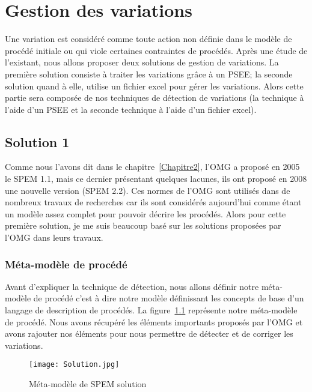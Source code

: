 \chapter{Gestion des variations} %

\label{Chapitre3} %
Une variation est considéré comme toute action non définie dans le modèle de procédé initiale ou qui viole certaines contraintes de procédés.
Après une étude de l'existant, nous allons proposer deux solutions de gestion de variations. La première solution consiste à traiter les variations grâce à un PSEE; la seconde solution quand à elle, utilise un fichier excel pour gérer les variations.
Alors cette partie sera composée de nos techniques de détection de variations (la technique à l'aide d'un PSEE et la seconde technique à l'aide d'un fichier excel).
\section{Solution 1}
Comme nous l'avons dit dans le chapitre~\ref{Chapitre2}, l'OMG a proposé en 2005 le SPEM 1.1, mais ce dernier présentant quelques lacunes, ils ont proposé en 2008 une nouvelle version (SPEM 2.2). 
Ces normes de l'OMG sont utilisés dans de nombreux travaux de recherches car ils sont considérés aujourd'hui comme étant un modèle assez complet pour pouvoir décrire les procédés. Alors pour cette première solution, je me suis beaucoup basé sur les solutions proposées par l'OMG dans leurs travaux.
\subsection{Méta-modèle de procédé}
Avant d'expliquer la technique de détection, nous allons définir notre méta-modèle de procédé c'est à dire notre modèle définissant les concepts de base d'un langage de description de procédés.
La figure~\ref{metamodele} représente notre méta-modèle de procédé. Nous avons récupéré les éléments importants proposés par l'OMG et avons rajouter nos éléments pour nous permettre de détecter et de corriger les variations.

\begin{figure}[h]
\centering
\texttt{[image: Solution.jpg]}
\caption{\label{metamodele}Méta-modèle de SPEM solution}
\end{figure}

